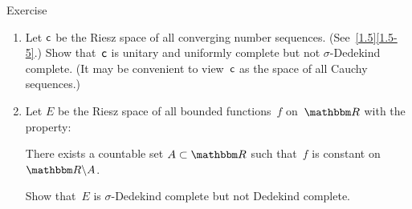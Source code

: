 \documentclass[main.tex]{subfiles}
\begin{document}
\begin{psec}{4.20}{Exercise}
\begin{enumerate}
\item \label{4.20-1}
Let $\mathsf{c}$ be the Riesz space of all converging number sequences.
(See~\ref{1.5}\ref{1.5-5}.)
Show that~$\mathsf{c}$ is unitary and uniformly complete
but not $\sigma$-Dedekind complete.
(It may be convenient to view~$\mathsf{c}$ as the space of all Cauchy sequences.)
%
\item \label{4.20-2}
Let $E$ be the Riesz space of all bounded functions~$f$ on~$\R$
with the property:
\begin{center}
\parbox{15em}{There exists a countable set $A\subset\R$
such that~$f$ is constant on $\R\backslash A$.}
\end{center}
Show that~$E$ is $\sigma$-Dedekind complete but not Dedekind complete.
\end{enumerate}
\end{psec}
\clearpage
\end{document}
